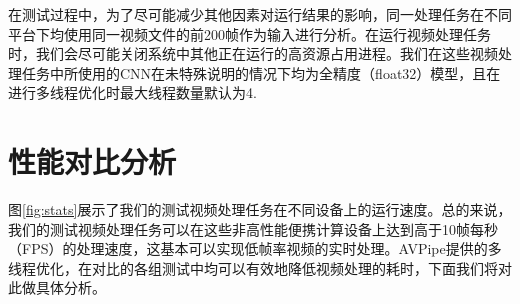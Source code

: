 在测试过程中，为了尽可能减少其他因素对运行结果的影响，同一处理任务在不同平台下均使用同一视频文件的前200帧作为输入进行分析。在运行视频处理任务时，我们会尽可能关闭系统中其他正在运行的高资源占用进程。我们在这些视频处理任务中所使用的CNN在未特殊说明的情况下均为全精度（float32）模型，且在进行多线程优化时最大线程数量默认为4.

\section{性能对比分析}

图\ref{fig:stats}展示了我们的测试视频处理任务在不同设备上的运行速度。总的来说，我们的测试视频处理任务可以在这些非高性能便携计算设备上达到高于10帧每秒（FPS）的处理速度，这基本可以实现低帧率视频的实时处理。AVPipe提供的多线程优化，在对比的各组测试中均可以有效地降低视频处理的耗时，下面我们将对此做具体分析。\par

